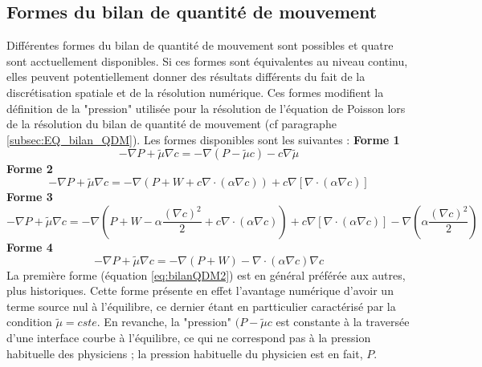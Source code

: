 \subsection{Formes du bilan de quantit\'e de mouvement}
Diff\'erentes formes du bilan de quantit\'e de mouvement sont possibles et quatre sont acctuellement disponibles. Si ces formes sont
\'equivalentes au niveau continu, elles peuvent potentiellement donner des r\'esultats diff\'erents du fait de la discr\'etisation spatiale et de
la r\'esolution num\'erique. Ces formes modifient la d\'efinition de la "pression" utilis\'ee pour la r\'esolution de l'\'equation de Poisson
lors de la r\'esolution du bilan de quantit\'e de mouvement (cf paragraphe \ref{subsec:EQ_bilan_QDM}). Les formes disponibles sont les suivantes :
\medskip\newline
\textbf{Forme 1}\newline
\begin{equation}
-\nabla P + \tilde{\mu}\nabla c = -\nabla\left(P - \tilde{\mu}c\right) - c\nabla\tilde{\mu}\label{eq:bilanQDM2}
\end{equation}
\textbf{Forme 2}\newline
\begin{equation}
-\nabla P + \tilde{\mu}\nabla c = -\nabla\left(P+W+c\nabla\cdot\left(\alpha\nabla c\right)\right)+c\nabla\left[\nabla\cdot\left(\alpha\nabla
c\right)\right]
\end{equation}
\textbf{Forme 3}\newline
\begin{equation}
-\nabla P + \tilde{\mu}\nabla c = -\nabla\left(P+W-\alpha\frac{\left(\nabla c\right)^2}{2}+c\nabla\cdot\left(\alpha\nabla
c\right)\right)+c\nabla\left[\nabla\cdot\left(\alpha\nabla c\right)\right]-\nabla\left(\alpha\frac{\left(\nabla c\right)^2}{2}\right)
\end{equation}
\textbf{Forme 4}\newline
\begin{equation}
-\nabla P + \tilde{\mu}\nabla c = -\nabla\left(P+W\right)-\nabla\cdot\left(\alpha\nabla c\right)\nabla c
\end{equation}
La premi\`ere forme (\'equation \ref{eq:bilanQDM2}) est en g\'en\'eral pr\'ef\'er\'ee aux autres, plus historiques. Cette forme pr\'esente en
effet l'avantage num\'erique d'avoir un terme source nul \`a l'\'equilibre, ce dernier \'etant en partticulier caract\'eris\'e par la condition
$\tilde{\mu}=cste$. En revanche, la "pression" $(P-\tilde{\mu}c$ est constante \`a la travers\'ee d'une interface courbe \`a l'\'equilibre, ce
qui ne correspond pas \`a la pression habituelle des physiciens ; la pression habituelle du physicien est en fait, $P$.
\bigskip
